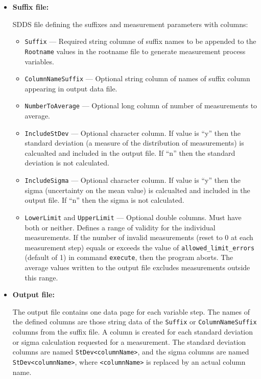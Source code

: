 \begin{itemize}
\item {\bf Suffix file:} \par
        SDDS file defining the suffixes and measurement parameters with columns:
                \begin{itemize}
           \item {\verb+Suffix+} --- Required string columne of suffix names to be appended to the \verb+Rootname+
                         values in the rootname file to generate measurement process variables.
           \item {\verb+ColumnNameSuffix+} --- Optional string column of names of suffix column appearing in output data file.
           \item {\verb+NumberToAverage+} --- Optional long column of number of measurements to average.
           \item {\verb+IncludeStDev+} --- Optional character column. If value is 
                        ``y'' then the standard deviation (a measure of the distribution of 
                        measurements) is calcualted and included
                        in the output file. If ``n'' then the standard deviation is not calculated.
           \item {\verb+IncludeSigma+} --- Optional character column. If value is ``y'' then the sigma (uncertainty on the mean value) 
                        is calcualted and included
                        in the output file. If ``n'' then the sigma is not calculated.
           \item {\verb+LowerLimit+} and {\verb+UpperLimit+} --- Optional double columns.
                         Must have both or neither. Defines a range of validity for the
                        individual measurements. If the number of invalid measurements (reset to 0 at each
                        measurement step) equals or exceeds the value
                        of {\verb+allowed_limit_errors+} (default of 1) in command {\verb+execute+}, then the program aborts.
                        The average values written to the output file excludes measurements outside this range.
                \end{itemize}

\item {\bf Output file:}\par
The output file contains one data page for each variable step.
The names of the defined columns are those string data of the {\verb+Suffix+} or {\verb+ColumnNameSuffix+} 
columns from the suffix file.
A column is created for each standard deviation or sigma calculation requested for a measurement.
The standard deviation columns are named \verb+StDev<columnName>+, and
the sigma columns are named \verb+StDev<columnName>+, where \verb+<columnName>+ is replaced
by an actual column name.


\end{itemize}
